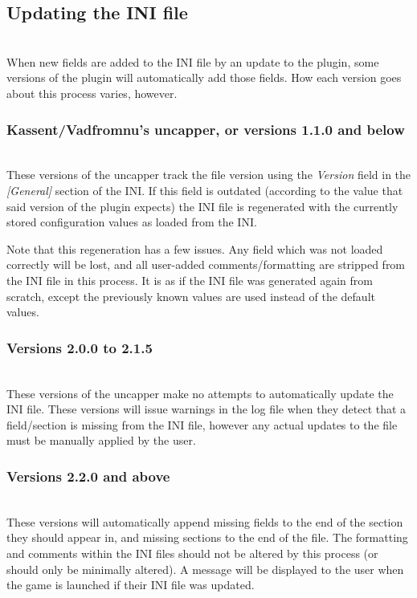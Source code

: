 \documentclass[12pt]{amsart}
\begin{document}
\startblock
\subsection{Updating the INI file}\hfill\\

When new fields are added to the INI file by an update to the plugin, some
versions of the plugin will automatically add those fields. How each version
goes about this process varies, however.
\stopblock

\startblock
\subsubsection{Kassent/Vadfromnu's uncapper, or versions 1.1.0 and below}\hfill\\

These versions of the uncapper track the file version using the \textit{Version}
field in the \textit{[General]} section of the INI. If this field is outdated
(according to the value that said version of the plugin expects) the INI file
is regenerated with the currently stored configuration values as loaded from
the INI.

Note that this regeneration has a few issues. Any field which was not loaded
correctly will be lost, and all user-added comments/formatting are stripped
from the INI file in this process. It is as if the INI file was generated again
from scratch, except the previously known values are used instead of the
default values.
\stopblock

\startblock
\subsubsection{Versions 2.0.0 to 2.1.5}\hfill\\

These versions of the uncapper make no attempts to automatically update the INI
file. These versions will issue warnings in the log file when they detect
that a field/section is missing from the INI file, however any actual updates
to the file must be manually applied by the user.
\stopblock

\startblock
\subsubsection{Versions 2.2.0 and above}\hfill\\

These versions will automatically append missing fields to the end of the
section they should appear in, and missing sections to the end of the file.
The formatting and comments within the INI files should not be altered by this
process (or should only be minimally altered). A message will be displayed to
the user when the game is launched if their INI file was updated.
\end{document}

